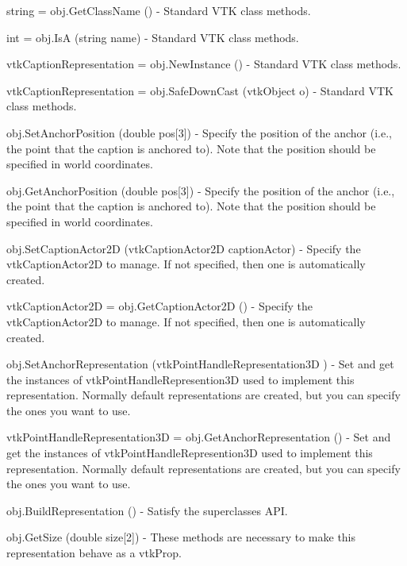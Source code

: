 \begin{DoxyItemize}
\item {\ttfamily string = obj.\-Get\-Class\-Name ()} -\/ Standard V\-T\-K class methods.  
\item {\ttfamily int = obj.\-Is\-A (string name)} -\/ Standard V\-T\-K class methods.  
\item {\ttfamily vtk\-Caption\-Representation = obj.\-New\-Instance ()} -\/ Standard V\-T\-K class methods.  
\item {\ttfamily vtk\-Caption\-Representation = obj.\-Safe\-Down\-Cast (vtk\-Object o)} -\/ Standard V\-T\-K class methods.  
\item {\ttfamily obj.\-Set\-Anchor\-Position (double pos\mbox{[}3\mbox{]})} -\/ Specify the position of the anchor (i.\-e., the point that the caption is anchored to). Note that the position should be specified in world coordinates.  
\item {\ttfamily obj.\-Get\-Anchor\-Position (double pos\mbox{[}3\mbox{]})} -\/ Specify the position of the anchor (i.\-e., the point that the caption is anchored to). Note that the position should be specified in world coordinates.  
\item {\ttfamily obj.\-Set\-Caption\-Actor2\-D (vtk\-Caption\-Actor2\-D caption\-Actor)} -\/ Specify the vtk\-Caption\-Actor2\-D to manage. If not specified, then one is automatically created.  
\item {\ttfamily vtk\-Caption\-Actor2\-D = obj.\-Get\-Caption\-Actor2\-D ()} -\/ Specify the vtk\-Caption\-Actor2\-D to manage. If not specified, then one is automatically created.  
\item {\ttfamily obj.\-Set\-Anchor\-Representation (vtk\-Point\-Handle\-Representation3\-D )} -\/ Set and get the instances of vtk\-Point\-Handle\-Represention3\-D used to implement this representation. Normally default representations are created, but you can specify the ones you want to use.  
\item {\ttfamily vtk\-Point\-Handle\-Representation3\-D = obj.\-Get\-Anchor\-Representation ()} -\/ Set and get the instances of vtk\-Point\-Handle\-Represention3\-D used to implement this representation. Normally default representations are created, but you can specify the ones you want to use.  
\item {\ttfamily obj.\-Build\-Representation ()} -\/ Satisfy the superclasses A\-P\-I.  
\item {\ttfamily obj.\-Get\-Size (double size\mbox{[}2\mbox{]})} -\/ These methods are necessary to make this representation behave as a vtk\-Prop.  

\end{DoxyItemize}
